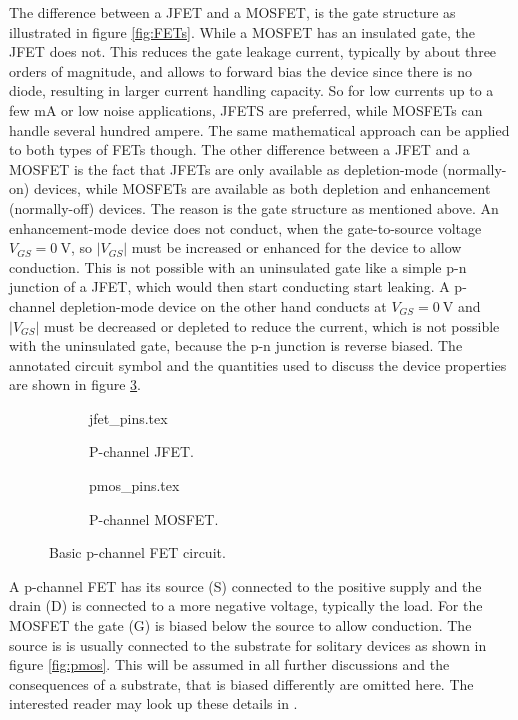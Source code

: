 The difference between a JFET and a MOSFET, is the gate structure as illustrated in figure \ref{fig:FETs}. While a MOSFET has an insulated gate, the JFET does not. This reduces the gate leakage current, typically by about three orders of magnitude, and allows to forward bias the device since there is no diode, resulting in larger current handling capacity. So for low currents up to a few \unit{\mA} or low noise applications, JFETS are preferred, while MOSFETs can handle several hundred ampere. The same mathematical approach can be applied to both types of FETs though. The other difference between a JFET and a MOSFET is the fact that JFETs are only available as depletion-mode (normally-on) devices, while MOSFETs are available as both depletion and enhancement (normally-off) devices. The reason is the gate structure as mentioned above. An enhancement-mode device does not conduct, when the gate-to-source voltage $V_{GS} = \qty{0}{\V}$, so $|V_{GS}|$ must be increased or enhanced for the device to allow conduction. This is not possible with an uninsulated gate like a simple p-n junction of a JFET, which would then start conducting start leaking. A p-channel depletion-mode device on the other hand conducts at $V_{GS} = \qty{0}{\V}$ and $|V_{GS}|$ must be decreased or depleted to reduce the current, which is not possible with the uninsulated gate, because the p-n junction is reverse biased. The annotated circuit symbol and the quantities used to discuss the device properties are shown in figure \ref{fig:fet_symbols}.

\begin{figure}[ht]
    \centering
    \begin{subfigure}{0.4\linewidth}
        \centering
        {jfet_pins.tex}
        \caption{P-channel JFET.}
        \label{fig:fet_symbols_jfet}
    \end{subfigure}
    \begin{subfigure}{0.4\linewidth}
        \centering
        {pmos_pins.tex}
        \caption{P-channel MOSFET.}
        \label{fig:fet_symbols_mosfet}
    \end{subfigure}
    \caption{Basic p-channel FET circuit.}
    \label{fig:fet_symbols}
\end{figure}

A p-channel FET has its source (S) connected to the positive supply and the drain (D) is connected to a more negative voltage, typically the load. For the MOSFET the gate (G) is biased below the source to allow conduction. The source is is usually connected to the substrate for solitary devices as shown in figure \ref{fig:pmos}. This will be assumed in all further discussions and the consequences of a substrate, that is biased differently are omitted here. The interested reader may look up these details in \cite{mosfet_details}.

